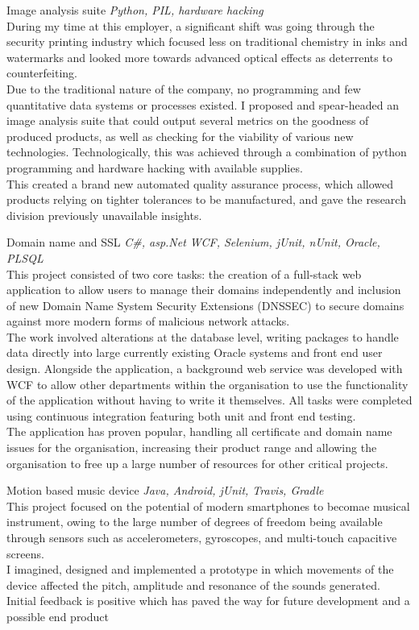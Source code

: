 \documentclass[]{friggeri-cv} %
\begin{document}
\begin{projectentrylist}
\projectentry
{Image analysis suite}
{\emph{Python, PIL, hardware hacking} \\
During my time at this employer, a significant shift was going through the security printing industry which focused less on traditional chemistry in inks and watermarks and looked more towards advanced optical effects as deterrents to counterfeiting. \\
Due to the traditional nature of the company, no programming and few quantitative data systems or processes existed. I proposed and spear-headed an image analysis suite that could output several metrics on the goodness of produced products, as well as checking for the viability of various new technologies. Technologically, this was achieved through a combination of python programming and hardware hacking with available supplies. \\
This created a brand new automated quality assurance process, which allowed products relying on tighter tolerances to be manufactured, and gave the research division previously unavailable insights.}

\projectentry
{Domain name and SSL}
{\emph{C\#, asp.Net WCF, Selenium, jUnit, nUnit, Oracle, PLSQL } \\
This project consisted of two core tasks: the creation of a full-stack web application to allow users to manage their domains independently and inclusion of new Domain Name System Security Extensions (DNSSEC) to secure domains against more modern forms of malicious network attacks.
\\
The work involved alterations at the database level, writing packages to handle data directly into large currently existing Oracle systems  and front end user design. Alongside the application, a background web service was developed with WCF to allow other departments within the organisation to use the functionality of the application without having to write it themselves. All tasks were completed using continuous integration featuring both unit and front end testing.
\\
The application has proven popular, handling all certificate and domain name issues for the organisation, increasing their product range and allowing the organisation to free up a large number of resources for other critical projects.}

\projectentry
{Motion based music device} 
{\emph{Java, Android, jUnit, Travis, Gradle} \\
This project focused on the potential of modern smartphones to becomae musical instrument, owing to the large number of degrees of freedom being available through sensors such as accelerometers, gyroscopes, and multi-touch capacitive screens. \\
I imagined, designed and implemented a prototype in which movements of the device affected the pitch, amplitude and resonance of the sounds generated. Initial feedback is positive which has paved the way for future development and a possible end product}

\end{projectentrylist}


\end{document}
